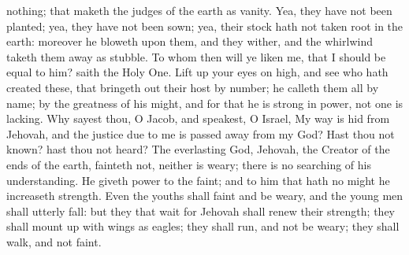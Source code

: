 nothing; that maketh the judges of the earth as vanity. Yea, they have not been planted; yea, they have not been sown; yea, their stock hath not taken root in the earth: moreover he bloweth upon them, and they wither, and the whirlwind taketh them away as stubble. To whom then will ye liken me, that I should be equal to him? saith the Holy One. Lift up your eyes on high, and see who hath created these, that bringeth out their host by number; he calleth them all by name; by the greatness of his might, and for that he is strong in power, not one is lacking.  Why sayest thou, O Jacob, and speakest, O Israel, My way is hid from Jehovah, and the justice due to me is passed away from my God? Hast thou not known? hast thou not heard? The everlasting God, Jehovah, the Creator of the ends of the earth, fainteth not, neither is weary; there is no searching of his understanding. He giveth power to the faint; and to him that hath no might he increaseth strength. Even the youths shall faint and be weary, and the young men shall utterly fall: but they that wait for Jehovah shall renew their strength; they shall mount up with wings as eagles; they shall run, and not be weary; they shall walk, and not faint. 

